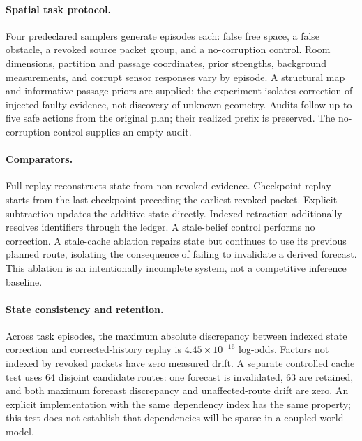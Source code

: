 \documentclass{article}
\begin{document}
\paragraph{Spatial task protocol.}
Four predeclared samplers generate \FamilyN{} episodes each: false free space, a false obstacle, a revoked source packet group, and a no-corruption control. Room dimensions, partition and passage coordinates, prior strengths, background measurements, and corrupt sensor responses vary by episode. A structural map and informative passage priors are supplied: the experiment isolates correction of injected faulty evidence, not discovery of unknown geometry. Audits follow up to five safe actions from the original plan; their realized prefix is preserved. The no-corruption control supplies an empty audit.

\paragraph{Comparators.}
Full replay reconstructs state from non-revoked evidence. Checkpoint replay starts from the last checkpoint preceding the earliest revoked packet. Explicit subtraction updates the additive state directly. Indexed retraction additionally resolves identifiers through the ledger. A stale-belief control performs no correction. A stale-cache ablation repairs state but continues to use its previous planned route, isolating the consequence of failing to invalidate a derived forecast. This ablation is an intentionally incomplete system, not a competitive inference baseline.

\begin{table}[t]
\centering\small

\vspace{7pt}
\caption{\textbf{Successful routes on the controlled task distribution.} Ours is evidence-indexed retraction with forecast invalidation and replanning. Each family has \FamilyN{} episodes. The stale-cache ablation retains the old route after state repair. Checkpoint replay and explicit subtraction match replay and ours exactly; no superiority among exact methods is implied.}
\label{tab:tasks}
\end{table}

\paragraph{State consistency and retention.}
Across \TaskN{} task episodes, the maximum absolute discrepancy between indexed state correction and corrected-history replay is $4.45\times10^{-16}$ log-odds. Factors not indexed by revoked packets have zero measured drift. A separate controlled cache test uses 64 disjoint candidate routes: one forecast is invalidated, 63 are retained, and both maximum forecast discrepancy and unaffected-route drift are zero. An explicit implementation with the same dependency index has the same property; this test does not establish that dependencies will be sparse in a coupled world model.
\end{document}
